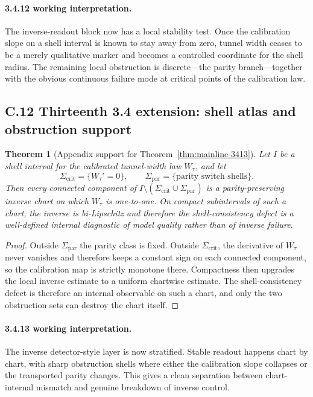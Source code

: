 \documentclass[12pt,a4paper]{article}
\newtheorem{theorem}{Theorem}[section]
\begin{document}
\paragraph{3.4.12 working interpretation.}
The inverse-readout block now has a local stability test. Once the calibration slope on a shell interval is known to stay away from zero, tunnel width ceases to be a merely qualitative marker and becomes a controlled coordinate for the shell radius. The remaining local obstruction is discrete---the parity branch---together with the obvious continuous failure mode at critical points of the calibration law.

\subsection*{C.12 Thirteenth 3.4 extension: shell atlas and obstruction support}

\begin{theorem}[Appendix support for Theorem~\ref{thm:mainline-3413}]
\label{thm:appendix-3413}
Let $I$ be a shell interval for the calibrated tunnel-width law $W_\tau$, and let
\[
 \Sigma_{\mathrm{crit}}=\{W_\tau'=0\},
 \qquad
 \Sigma_{\mathrm{par}}=\{\text{parity switch shells}\}.
\]
Then every connected component of $I\setminus(\Sigma_{\mathrm{crit}}\cup\Sigma_{\mathrm{par}})$ is a parity-preserving inverse chart on which $W_\tau$ is one-to-one. On compact subintervals of such a chart, the inverse is bi-Lipschitz and therefore the shell-consistency defect is a well-defined internal diagnostic of model quality rather than of inverse failure.
\end{theorem}

\begin{proof}
Outside $\Sigma_{\mathrm{par}}$ the parity class is fixed. Outside $\Sigma_{\mathrm{crit}}$, the derivative of $W_\tau$ never vanishes and therefore keeps a constant sign on each connected component, so the calibration map is strictly monotone there. Compactness then upgrades the local inverse estimate to a uniform chartwise estimate. The shell-consistency defect is therefore an internal observable on such a chart, and only the two obstruction sets can destroy the chart itself.
\end{proof}

\paragraph{3.4.13 working interpretation.}
The inverse detector-style layer is now stratified. Stable readout happens chart by chart, with sharp obstruction shells where either the calibration slope collapses or the transported parity changes. This gives a clean separation between chart-internal mismatch and genuine breakdown of inverse control.
\end{document}
